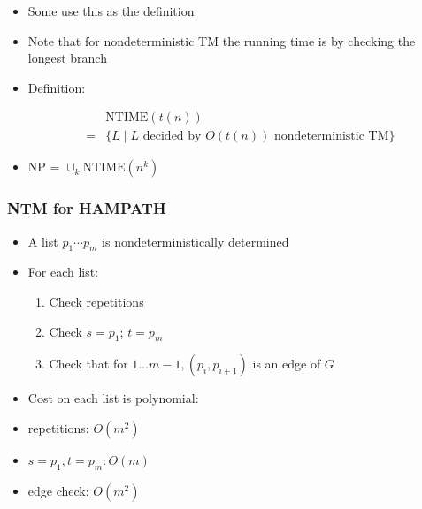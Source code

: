 \begin{frame}[allowframebreaks]
\begin{itemize}
\item Some use this as the definition

\item Note that for nondeterministic TM the running time is by checking the longest branch

\item Definition:

  \begin{equation*}
    \begin{split}
      & \text{NTIME}(t(n)) \\
      =& \{L\mid L
\text{ decided by } O(t(n))
\text{ nondeterministic TM}\}
\end{split}
\end{equation*}
\item NP = $\cup_k \text{NTIME}(n^k)$

\end{itemize}\end{frame} \begin{frame}[allowframebreaks] \frametitle{NTM for HAMPATH}
  \begin{itemize}
\item A list $p_1\cdots p_m$ is nondeterministically determined

\item For each list:

  \begin{enumerate}
  \item  Check repetitions
  \item Check $s=p_1$; $t=p_m$
\item Check that for $1 \ldots m-1, (p_i, p_{i+1})$ is an edge of $G$
  \end{enumerate}
\item Cost on each list is polynomial:

  
\item [] repetitions: $O(m^2)$

\item [] $s=p_1, t = p_m: O(m)$

\item [] edge check: $O(m^2)$

\end{itemize}\end{frame}



